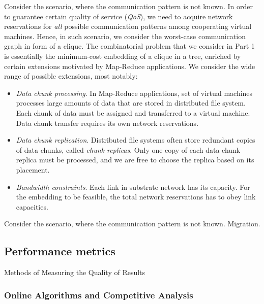 
Consider the scenario, where the communication pattern is not known.
In order to guarantee certain quality of service (\emph{QoS}), we need to acquire network reservations for \emph{all} possible communication patterns among cooperating virtual machines.
Hence, in such scenario, we consider the worst-case communication graph in form of a clique.
The combinatorial problem that we consider in Part 1 is essentially the minimum-cost embedding of a clique in a tree, enriched by certain extensions motivated by Map-Reduce applications.
We consider the wide range of possible extensions, most notably:

\begin{itemize}
\item \emph{Data chunk processing}. In Map-Reduce applications, set of virtual machines processes large amounts of data that are stored in distributed file system. Each chunk of data must be assigned and transferred to a virtual machine. Data chunk transfer requires its own network reservations.

\item \emph{Data chunk replication}. Distributed file systems often store redundant copies of data chunks, called \emph{chunk replicas}. Only one copy of each data chunk replica must be processed, and we are free to choose the replica based on its placement.

\item \emph{Bandwidth constraints}. Each link in substrate network has its capacity. For the embedding to be feasible, the total network reservations has to obey link capacities.
\end{itemize}

Consider the scenario, where the communication pattern is not known.
Migration.





\subsection{Performance metrics}

Methods of Measuring the Quality of Results

\subsubsection{Online Algorithms and Competitive Analysis}

